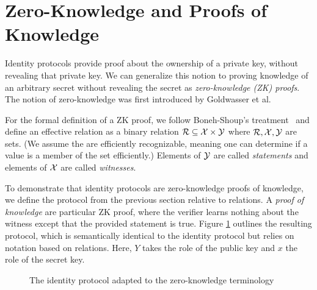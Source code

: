 \section{Zero-Knowledge and Proofs of Knowledge}
\label{sec:zknowledge}
Identity protocols provide proof about the ownership of a private key, without revealing that private key.
We can generalize this notion to proving knowledge of an arbitrary secret without revealing the secret as \emph{zero-knowledge (ZK) proofs}. 
The notion of zero-knowledge was first introduced by Goldwasser et al.~\cite{goldwasser1989knowledge}

For the formal definition of a ZK proof, we follow Boneh-Shoup's treatment~\cite{BonehShoupBook} and define an effective relation as a binary relation ${\cal R} \subseteq {\cal X} \times {\cal Y}$  where ${\cal R}, {\cal X},{\cal Y}$ are sets.
(We assume the are efficiently recognizable, meaning one can determine if a value is a member of the set efficiently.)
Elements of ${\cal Y}$ are called \emph{statements} and elements of ${\cal X}$ are called \emph{witnesses}.

To demonstrate that identity protocols are zero-knowledge proofs of knowledge, we define the protocol from the previous section relative to relations.
A \emph{proof of knowledge} are particular ZK proof, where the verifier learns nothing about the witness except that the provided statement is true.
Figure \ref{fig:sigmaid} outlines the resulting protocol, which is semantically identical to the identity protocol but relies on notation based on relations.
Here, $Y$ takes the role of the public key and $x$ the role of the secret key.

\begin{figure}[h]
\centering


\caption{The identity protocol adapted to the zero-knowledge terminology}
\label{fig:sigmaid}
\end{figure}

